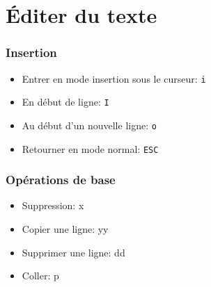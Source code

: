 \documentclass{beamer}
\begin{document}
\section{Éditer du texte}
\begin{frame} \frametitle{Insertion}
  \begin{itemize}
    \item Entrer en mode insertion sous le curseur: {\tt i}
    \item En début de ligne: {\tt I}
    \item Au début d'un nouvelle ligne: {\tt o}
    \item Retourner en mode normal: {\tt ESC}
  \end{itemize}
\end{frame}
\begin{frame} \frametitle{Opérations de base}
  \begin{itemize}
    \item Suppression: x
    \item Copier une ligne: yy
    \item Supprimer une ligne: dd
    \item Coller: p
  \end{itemize}
\end{frame}
\end{document}
